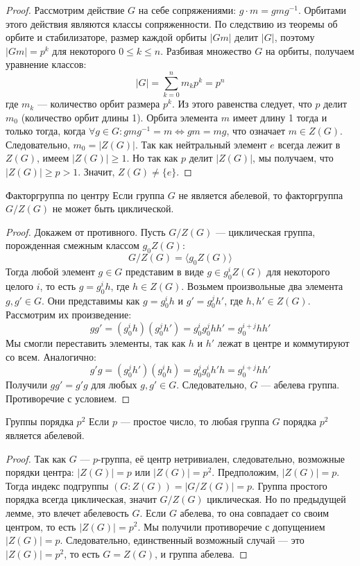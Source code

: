\begin{proof}
	Рассмотрим действие $G$ на себе сопряжениями: $g \cdot m = gmg^{-1}$.
	Орбитами этого действия являются классы сопряженности. По следствию из теоремы об орбите и стабилизаторе, размер каждой орбиты $|Gm|$ делит $|G|$, поэтому $|Gm| = p^k$ для некоторого $0 \le k \le n$.
	Разбивая множество $G$ на орбиты, получаем уравнение классов:
	\[ |G| = \sum_{k=0}^{n} m_k p^k = p^n \]
	где $m_k$ — количество орбит размера $p^k$.
	Из этого равенства следует, что $p$ делит $m_0$ (количество орбит длины 1).
	Орбита элемента $m$ имеет длину 1 тогда и только тогда, когда $\forall g \in G \colon gmg^{-1} = m \iff gm = mg$, что означает $m \in Z(G)$.
	Следовательно, $m_0 = |Z(G)|$. Так как нейтральный элемент $e$ всегда лежит в $Z(G)$, имеем $|Z(G)| \ge 1$. Но так как $p$ делит $|Z(G)|$, мы получаем, что $|Z(G)| \ge p > 1$. Значит, $Z(G) \neq \{e\}$.
\end{proof}

\begin{Lemma}{Факторгруппа по центру}{}
	Если группа $G$ не является абелевой, то факторгруппа $G/Z(G)$ не может быть циклической.
\end{Lemma}

\begin{proof}
	Докажем от противного. Пусть $G/Z(G)$ — циклическая группа, порожденная смежным классом $g_0 Z(G)$:
	\[ G/Z(G) = \langle g_0 Z(G) \rangle \]
	Тогда любой элемент $g \in G$ представим в виде $g \in g_0^i Z(G)$ для некоторого целого $i$, то есть $g = g_0^i h$, где $h \in Z(G)$.
	Возьмем произвольные два элемента $g, g' \in G$. Они представимы как $g = g_0^i h$ и $g' = g_0^j h'$, где $h, h' \in Z(G)$.
	Рассмотрим их произведение:
	\[ gg' = (g_0^i h)(g_0^j h') = g_0^i g_0^j h h' = g_0^{i+j} h h' \]
	Мы смогли переставить элементы, так как $h$ и $h'$ лежат в центре и коммутируют со всем.
	Аналогично:
	\[ g'g = (g_0^j h')(g_0^i h) = g_0^j g_0^i h' h = g_0^{i+j} h h' \]
	Получили $gg' = g'g$ для любых $g, g' \in G$. Следовательно, $G$ — абелева группа. Противоречие с условием.
\end{proof}

\begin{Corollary}{Группы порядка $p^2$}{}
	Если $p$ — простое число, то любая группа $G$ порядка $p^2$ является абелевой.
\end{Corollary}

\begin{proof}
	Так как $G$ — $p$-группа, её центр нетривиален, следовательно, возможные порядки центра: $|Z(G)| = p$ или $|Z(G)| = p^2$.
	Предположим, $|Z(G)| = p$. Тогда индекс подгруппы $(G : Z(G)) = |G/Z(G)| = p$.
	Группа простого порядка всегда циклическая, значит $G/Z(G)$ циклическая. Но по предыдущей лемме, это влечет абелевость $G$.
	Если $G$ абелева, то она совпадает со своим центром, то есть $|Z(G)| = p^2$. Мы получили противоречие с допущением $|Z(G)| = p$.
	Следовательно, единственный возможный случай — это $|Z(G)| = p^2$, то есть $G = Z(G)$, и группа абелева.
\end{proof}